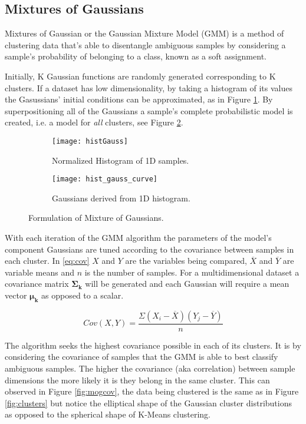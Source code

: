  \subsection{Mixtures of Gaussians}

Mixtures of Gaussian or the Gaussian Mixture Model (GMM) is a method of clustering data that's able to disentangle ambiguous samples by considering a sample's probability of belonging to a class, known as a soft assignment. 

Initially, K Gaussian functions are randomly generated corresponding to K clusters. If a dataset has low dimensionality, by taking a histogram of its values the Gasussians' initial conditions can be approximated, as in Figure \ref{fig:histGauss}. By superpositioning all of the Gaussians a sample's complete probabilistic model is created, i.e. a model for \emph{all} clusters, see Figure \ref{fig:histCurve}. 

\begin{figure}[H]
	\centering
	\begin{subfigure}[b]{0.5\linewidth}
            \centering\texttt{[image: histGauss]}
      		\caption{Normalized Histogram of 1D samples.}
		\label{fig:histGauss}
    	\end{subfigure}%
    	\begin{subfigure}[b]{0.5\linewidth}
      		\centering\texttt{[image: hist\_gauss\_curve]}
      		\caption{Gaussians derived from 1D histogram.}
       		\label{fig:histCurve}
		\end{subfigure}
		\caption{Formulation of Mixture of Gaussians.}
    	\label{fig:mixture}
\end{figure}

With each iteration of the GMM algorithm the parameters of the model's component Gaussians are tuned according to the covariance between samples in each cluster. In \ref{eq:cov} $X$ and $Y$ are the variables being compared, $\overline X$ and $\overline Y$ are variable means and $n$ is the number of samples. For a multidimensional dataset a covariance matrix $\bm{\Sigma_k}$ will be generated and each Gaussian will require a mean vector $\bm{\mu_k}$ as opposed to a scalar. 

\begin{equation}
Cov(X, Y) = \frac{\Sigma(X_i-\overline X)(Y_j-\overline Y)}{n}
\label{eq:cov}
\end{equation}



The algorithm seeks the highest covariance possible in each of its clusters. It is by considering the covariance of samples that the GMM is able to best classify ambiguous samples. The higher the covariance (aka correlation) between sample dimensions the more likely it is they belong in the same cluster. This can observed in Figure \ref{fig:mogcov}, the data being clustered is the same as in Figure \ref{fig:clusters} but notice the elliptical shape of the Gaussian cluster distributions as opposed to the spherical shape of K-Means clustering.

